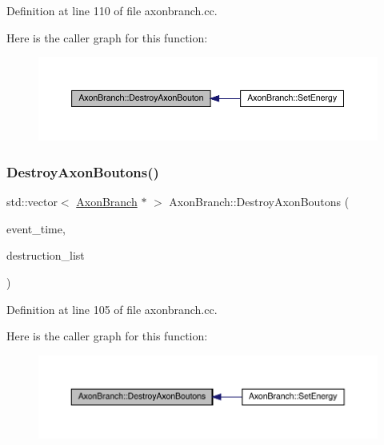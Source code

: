 Definition at line 110 of file axonbranch.\+cc.

Here is the caller graph for this function\+:
\nopagebreak
\begin{figure}[H]
\begin{center}
\leavevmode
\includegraphics[width=350pt]{class_axon_branch_a024c8666555702ebe67e2a5caf1b866a_icgraph}
\end{center}
\end{figure}
\mbox{\label{class_axon_branch_a8c022977e091b8cab367b21c0c4930ea}} 
\subsubsection{\texorpdfstring{Destroy\+Axon\+Boutons()}{DestroyAxonBoutons()}}
{\footnotesize\ttfamily std\+::vector$<$ \hyperlink{class_axon_branch}{Axon\+Branch} $\ast$ $>$ Axon\+Branch\+::\+Destroy\+Axon\+Boutons (\begin{DoxyParamCaption}\item[{std\+::chrono\+::time\+\_\+point$<$ \hyperlink{universe_8h_a0ef8d951d1ca5ab3cfaf7ab4c7a6fd80}{Clock} $>$}]{event\+\_\+time,  }\item[{std\+::vector$<$ \hyperlink{class_axon_branch}{Axon\+Branch} $\ast$$>$}]{destruction\+\_\+list }\end{DoxyParamCaption})}



Definition at line 105 of file axonbranch.\+cc.

Here is the caller graph for this function\+:
\nopagebreak
\begin{figure}[H]
\begin{center}
\leavevmode
\includegraphics[width=350pt]{class_axon_branch_a8c022977e091b8cab367b21c0c4930ea_icgraph}
\end{center}
\end{figure}
\mbox{\label{class_axon_branch_a6fa6eea91e72fd142f3d691f7ca4c99a}} 
